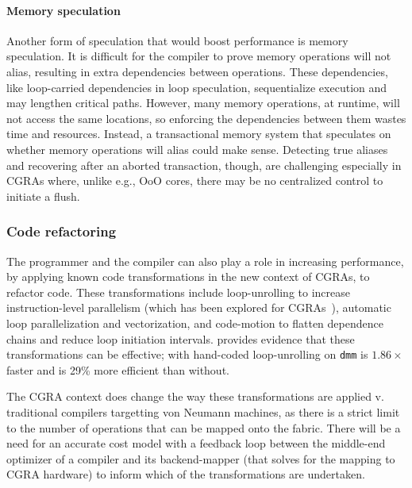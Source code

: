 \paragraph{Memory speculation}
Another form of speculation that would boost performance is memory speculation.
% 
% 
It is difficult for the compiler to prove memory operations will not alias, resulting in extra dependencies between operations.
% 
These dependencies, like loop-carried dependencies in loop speculation, sequentialize execution and may lengthen critical paths.
% 
However, many memory operations, at runtime, will not access the same locations,  so enforcing the dependencies between them wastes time and resources.
% 
Instead, a transactional memory system that speculates on whether memory operations will alias could make sense.
% 
Detecting true aliases and recovering after an aborted transaction, though, are challenging especially in CGRAs where, unlike e.g., OoO cores, there may be no centralized control to initiate a flush.

\subsubsection{Code refactoring}
The programmer and the compiler can also play a role in increasing performance, by applying known code transformations in the new context of CGRAs, to refactor code.
% 
These transformations include loop-unrolling to increase instruction-level parallelism (which has been explored for CGRAs~\cite{karunaratne2017hycube}), automatic loop parallelization and vectorization, and code-motion to flatten dependence chains and reduce loop initiation intervals.
% 
\riptide provides evidence that these transformations can be effective; \riptide with hand-coded loop-unrolling on {\tt dmm} is $1.86\times$ faster and is 29\% more efficient than without.
% 

The CGRA context does change the way these transformations are applied v. traditional compilers targetting von Neumann machines, as there is a strict limit to the number of operations that can be mapped onto the fabric.
% 
There will be a need for an accurate cost model with a feedback loop between the middle-end optimizer of a compiler and its backend-mapper (that solves for the mapping to CGRA hardware) to inform which of the transformations are undertaken.
% 
% 

